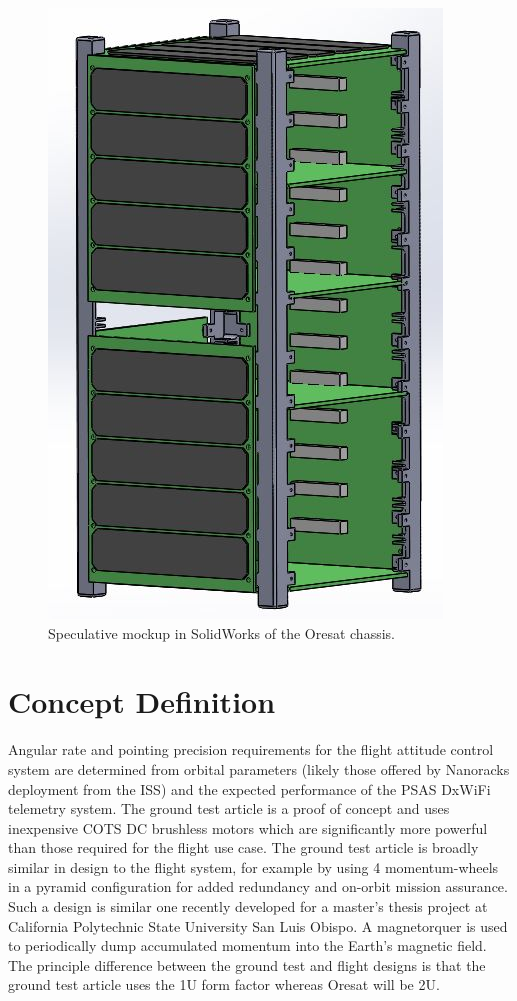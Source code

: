 \documentclass[]{aiaa-tc}%
\begin{document}
\begin{figure}[h!]
  \centering
  \includegraphics[width=0.3\linewidth]{Cube_2U.jpg}
  \caption{Speculative mockup in SolidWorks of the Oresat chassis.}
  \label{fig:oresat}
\end{figure}

\section{Concept Definition}
	Angular rate and pointing precision requirements for the flight attitude control system are determined from orbital parameters (likely those offered by Nanoracks deployment from the ISS) and the expected performance of the PSAS DxWiFi telemetry system. The ground test article is a proof of concept and uses inexpensive COTS DC brushless motors which are significantly more powerful than those required for the flight use case. The ground test article is broadly similar in design to the flight system, for example by using 4 momentum-wheels in a pyramid configuration for added redundancy and on-orbit mission assurance. Such a design is similar one recently developed for a master's thesis project at California Polytechnic State University San Luis Obispo\cite{Logan:08bk}. A magnetorquer is used to periodically dump accumulated momentum into the Earth's magnetic field. The principle difference between the ground test and flight designs is that the ground test article uses the 1U form factor whereas Oresat will be 2U.
\end{document}
